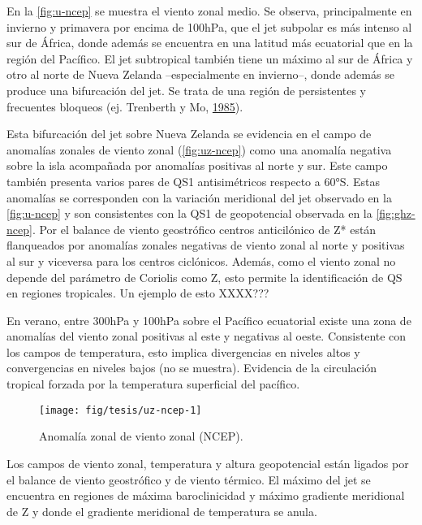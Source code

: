 \documentclass[spanish,a4paper,12pt]{book}
\begin{document}
En la \autoref{fig:u-ncep} se muestra el viento zonal medio. Se observa,
principalmente en invierno y primavera por encima de 100hPa, que el jet
subpolar es más intenso al sur de África, donde además se encuentra en
una latitud más ecuatorial que en la región del Pacífico. El jet
subtropical también tiene un máximo al sur de África y otro al norte de
Nueva Zelanda --especialmente en invierno--, donde además se produce una
bifurcación del jet. Se trata de una región de persistentes y frecuentes
bloqueos (ej. Trenberth y Mo,
\protect\hyperlink{ref-Trenberth1985}{1985}).

Esta bifurcación del jet sobre Nueva Zelanda se evidencia en el campo de
anomalías zonales de viento zonal (\autoref{fig:uz-ncep}) como una
anomalía negativa sobre la isla acompañada por anomalías positivas al
norte y sur. Este campo también presenta varios pares de QS1
antisimétricos respecto a 60°S. Estas anomalías se corresponden con la
variación meridional del jet observado en la \autoref{fig:u-ncep} y son
consistentes con la QS1 de geopotencial observada en la
\autoref{fig:ghz-ncep}. Por el balance de viento geostrófico centros
anticilónico de Z* están flanqueados por anomalías zonales negativas de
viento zonal al norte y positivas al sur y viceversa para los centros
ciclónicos. Además, como el viento zonal no depende del parámetro de
Coriolis como Z, esto permite la identificación de QS en regiones
tropicales. Un ejemplo de esto XXXX???

En verano, entre 300hPa y 100hPa sobre el Pacífico ecuatorial existe una
zona de anomalías del viento zonal positivas al este y negativas al
oeste. Consistente con los campos de temperatura, esto implica
divergencias en niveles altos y convergencias en niveles bajos (no se
muestra). Evidencia de la circulación tropical forzada por la
temperatura superficial del pacífico.

\begin{landscape}\begin{figure}

{\centering \texttt{[image: fig/tesis/uz-ncep-1]} 

}

\caption{Anomalía zonal de viento zonal (NCEP).}\label{fig:uz-ncep}
\end{figure}
\end{landscape}

Los campos de viento zonal, temperatura y altura geopotencial están
ligados por el balance de viento geostrófico y de viento térmico. El
máximo del jet se encuentra en regiones de máxima baroclinicidad y
máximo gradiente meridional de Z y donde el gradiente meridional de
temperatura se anula.
\end{document}
